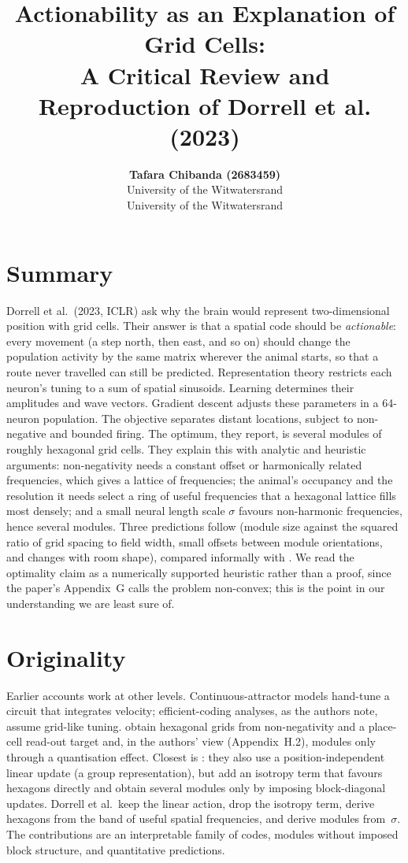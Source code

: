 \documentclass[10pt,letterpaper]{article}
\title{Actionability as an Explanation of Grid Cells:\\A Critical Review and Reproduction of Dorrell et al. (2023)}
\author{{\large\bf Tafara Chibanda (2683459)}\\University of the Witwatersrand
\And {\large\bf Nathan Le Roux (2717495)}\\University of the Witwatersrand}
\begin{document}
\maketitle

\section{Summary}
Dorrell et al.\ (2023, ICLR) ask why the brain would represent two-dimensional position with grid cells. Their answer is that a spatial code should be \emph{actionable}: every movement (a step north, then east, and so on) should change the population activity by the same matrix wherever the animal starts, so that a route never travelled can still be predicted. Representation theory restricts each neuron's tuning to a sum of spatial sinusoids. Learning determines their amplitudes and wave vectors. Gradient descent adjusts these parameters in a 64-neuron population. The objective separates distant locations, subject to non-negative and bounded firing. The optimum, they report, is several modules of roughly hexagonal grid cells. They explain this with analytic and heuristic arguments: non-negativity needs a constant offset or harmonically related frequencies, which gives a lattice of frequencies; the animal's occupancy and the resolution it needs select a ring of useful frequencies that a hexagonal lattice fills most densely; and a small neural length scale $\sigma$ favours non-harmonic frequencies, hence several modules. Three predictions follow (module size against the squared ratio of grid spacing to field width, small offsets between module orientations, and changes with room shape), compared informally with \citet{stensola2012}. We read the optimality claim as a numerically supported heuristic rather than a proof, since the paper's Appendix~G calls the problem non-convex; this is the point in our understanding we are least sure of.

\section{Originality}
Earlier accounts work at other levels. Continuous-attractor models \citep{burak2009} hand-tune a circuit that integrates velocity; efficient-coding analyses, as the authors note, assume grid-like tuning. \citet{sorscher2019} obtain hexagonal grids from non-negativity and a place-cell read-out target and, in the authors' view (Appendix~H.2), modules only through a quantisation effect. Closest is \citet{gao2021}: they also use a position-independent linear update (a group representation), but add an isotropy term that favours hexagons directly and obtain several modules only by imposing block-diagonal updates. Dorrell et al.\ keep the linear action, drop the isotropy term, derive hexagons from the band of useful spatial frequencies, and derive modules from~$\sigma$. The contributions are an interpretable family of codes, modules without imposed block structure, and quantitative predictions.
\end{document}
